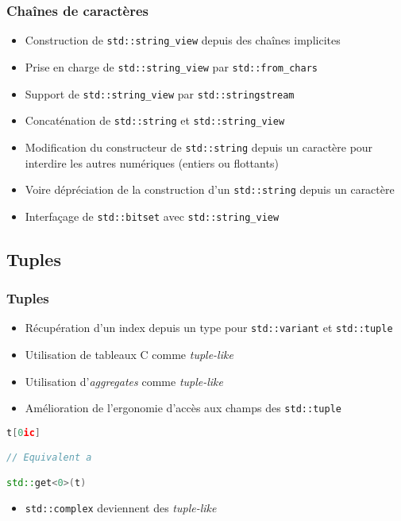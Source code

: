 \documentclass[C++.tex]{subfiles}
\begin{document}
\begin{frame}[fragile]
	\frametitle{Chaînes de caractères}
	\begin{itemize}
		\item Construction de \lstinline|std::string_view| depuis des chaînes implicites
		\item Prise en charge de \lstinline|std::string_view| par \lstinline|std::from_chars|
		\item Support de \lstinline|std::string_view| par \lstinline|std::stringstream|
		\item Concaténation de \lstinline|std::string| et \lstinline|std::string_view|
		\item Modification du constructeur de \lstinline|std::string| depuis un caractère pour interdire les autres numériques (entiers ou flottants)


		\item Voire dépréciation de la construction d'un \lstinline|std::string| depuis un caractère
		\item Interfaçage de \lstinline|std::bitset| avec \lstinline|std::string_view|
	\end{itemize}
\end{frame}

\subsection*{Tuples}
\begin{frame}[fragile]
	\frametitle{Tuples}
	\begin{itemize}
		\item Récupération d'un index depuis un type pour \lstinline|std::variant| et \lstinline|std::tuple|
		\item Utilisation de tableaux C comme \textit{tuple-like}


		\item Utilisation d'\textit{aggregates} comme \textit{tuple-like}
		\item Amélioration de l'ergonomie d'accès aux champs des \lstinline|std::tuple|
	\end{itemize}

	\begin{lstlisting}[language=C++]
t[0ic]

// Equivalent a

std::get<0>(t)\end{lstlisting}

	\begin{itemize}
		\item \lstinline|std::complex| deviennent des \textit{tuple-like}
	\end{itemize}
\end{frame}
\end{document}
